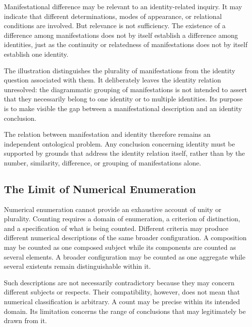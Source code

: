 Manifestational difference may be relevant to an
identity-related inquiry. It may indicate that
different determinations, modes of appearance,
or relational conditions are involved. But relevance
is not sufficiency. The existence of a difference
among manifestations does not by itself establish
a difference among identities, just as the
continuity or relatedness of manifestations does
not by itself establish one identity.



The illustration distinguishes the plurality of
manifestations from the identity question associated
with them. It deliberately leaves the identity
relation unresolved: the diagrammatic grouping of
manifestations is not intended to assert that
they necessarily belong to one identity or to
multiple identities. Its purpose is to make visible
the gap between a manifestational description
and an identity conclusion.

The relation between manifestation and identity
therefore remains an independent ontological problem.
Any conclusion concerning identity must be supported
by grounds that address the identity relation itself,
rather than by the number, similarity, difference,
or grouping of manifestations alone.

\subsection{The Limit of Numerical Enumeration}

Numerical enumeration cannot provide an exhaustive
account of unity or plurality. Counting requires
a domain of enumeration, a criterion of distinction,
and a specification of what is being counted.
Different criteria may produce different numerical
descriptions of the same broader configuration.
A composition may be counted as one composed
subject while its components are counted as several
elements. A broader configuration may be counted
as one aggregate while several existents remain
distinguishable within it.

Such descriptions are not necessarily contradictory
because they may concern different subjects or
respects. Their compatibility, however, does not
mean that numerical classification is arbitrary.
A count may be precise within its intended domain.
Its limitation concerns the range of conclusions
that may legitimately be drawn from it.

